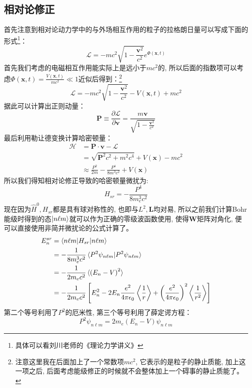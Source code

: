 \documentclass[a4paper,zihao=-4,linespread=1]{ctexrep}
\begin{document}
    \subsection*{相对论修正}
    首先注意到相对论动力学中的与外场相互作用的粒子的拉格朗日量可以写成下面的形式\footnote{具体可以看刘川老师的《理论力学讲义》}：
    \begin{equation}
        \mathcal{L}=-mc^2\sqrt{1-\frac{\mathbf{v}^2}{c^2}}e^{\Phi(\mathbf{x},t)}
    \end{equation}
    首先我们考虑的电磁相互作用能实际上是远小于$mc^2$的, 所以后面的指数项可以考虑$\Phi(\mathbf{x},t)=\frac{V(\mathbf{x},t)}{mc^2}\ll1$近似后得到：\footnote{注意这里我在后面加上了一个常数项$mc^2$, 它表示的是粒子的静止质能, 加上这一项之后, 后面考虑能级修正的时候就不会整体加上一个碍事的静止质能了。}
    \begin{equation}
        \mathcal{L}=-mc^2\sqrt{1-\frac{\mathbf{v}^2}{c^2}}-V(\mathbf{x},t)+mc^2
    \end{equation}
    据此可以计算出正则动量：
    \[\mathbf{P}\equiv\frac{\partial\mathcal{L}}{\partial\mathbf{v}}=\frac{m\mathbf{v}}{\sqrt{1-\frac{\mathbf{v}^2}{c^2}}}\]
    最后利用勒让德变换计算哈密顿量：
    \begin{align*}
        \mathcal{H}&=\mathbf{P}\cdot\mathbf{v}-\mathcal{L}\\
        &=\sqrt{\mathbf{P}^2c^2+m^2c^4}+V(\mathbf{x})-mc^2\\
        &\approx \frac{P^2}{2m}-\frac{P^4}{8m^3c^2}+V(\mathbf{x})
    \end{align*}
    所以我们得知相对论修正导致的哈密顿量微扰为:
    \[H_{sr}=-\frac{P^4}{8m_e^3c^2}\]
    现在因为$\hat{H}^0,H_{sr}$都是具有球对称性的, 也即与$L^2,\mathbf{L}$均对易, 所以之前我们计算Bohr能级时得到的态$\ket{n\ell m }$就可以作为正确的零级波函数使用,
    使得$\mathbf{W}$矩阵对角化, 便可以直接使用非简并微扰论的公式计算了。
    \begin{align*}
        E^{sr}_n&=\braket{n\ell m|H_{sr}|n \ell m}\\
        &=-\frac{1}{8m_e^3c^2}\braket{P^2\psi_{n\ell m}|P^2\psi_{n\ell m}}\\
        &=-\frac{1}{2m_ec^2}\braket{\left(E_n-V\right)^2}\\
        &=-\frac{1}{2m_ec^2}\left[E_n^2-2E_n\frac{e^2}{4\pi\epsilon_0}\Braket{\frac{1}{r}}+\left(\frac{e^2}{4\pi\epsilon_0}\right)^2\Braket{\frac{1}{r^2}}\right]
    \end{align*}
    第二个等号利用了$P^2$的厄米性, 第三个等号利用了薛定谔方程：
    \[P^2\psi_{n\ell m}=2m_e(E_n-V)\psi_{n\ell m}\]
\end{document}
